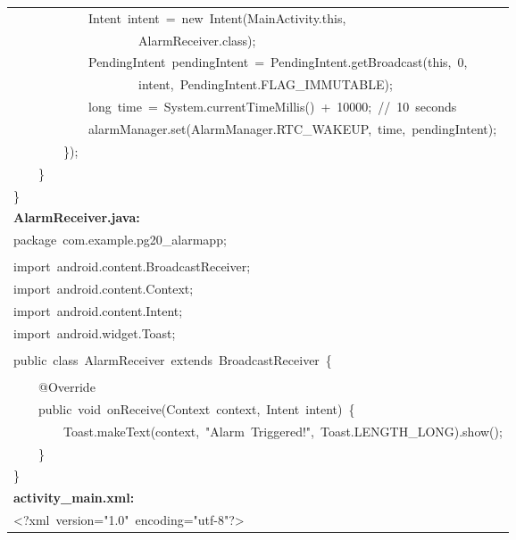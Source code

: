 \documentclass[a4paper,12pt]{article}
\begin{document}
\begin{longtable}{|p{}|}
{\ttfamily\small \ \ \ \ \ \ \ \ \ \ \ \ Intent\ intent\ =\ new\ Intent(MainActivity.this,\ } \\
{\ttfamily\small \ \ \ \ \ \ \ \ \ \ \ \ \ \ \ \ \ \ \ \ AlarmReceiver.class);} \\
{\ttfamily\small \ \ \ \ \ \ \ \ \ \ \ \ PendingIntent\ pendingIntent\ =\ PendingIntent.getBroadcast(this,\ 0,\ } \\
{\ttfamily\small \ \ \ \ \ \ \ \ \ \ \ \ \ \ \ \ \ \ \ \ intent,\ PendingIntent.FLAG\_IMMUTABLE);} \\
{\ttfamily\small \ \ \ \ \ \ \ \ \ \ \ \ long\ time\ =\ System.currentTimeMillis()\ +\ 10000;\ //\ 10\ seconds} \\
{\ttfamily\small \ \ \ \ \ \ \ \ \ \ \ \ alarmManager.set(AlarmManager.RTC\_WAKEUP,\ time,\ pendingIntent);} \\
{\ttfamily\small \ \ \ \ \ \ \ \ \});} \\
{\ttfamily\small \ \ \ \ \}} \\
{\ttfamily\small \}} \\
\hline
\rule{0pt}{13pt}\textbf{AlarmReceiver.java:} \\
\hline
{\ttfamily\small package\ com.example.pg20\_alarmapp;} \\
\strut \\
{\ttfamily\small import\ android.content.BroadcastReceiver;} \\
{\ttfamily\small import\ android.content.Context;} \\
{\ttfamily\small import\ android.content.Intent;} \\
{\ttfamily\small import\ android.widget.Toast;} \\
\strut \\
{\ttfamily\small public\ class\ AlarmReceiver\ extends\ BroadcastReceiver\ \{} \\
\strut \\
{\ttfamily\small \ \ \ \ @Override} \\
{\ttfamily\small \ \ \ \ public\ void\ onReceive(Context\ context,\ Intent\ intent)\ \{} \\
{\ttfamily\small \ \ \ \ \ \ \ \ Toast.makeText(context,\ "Alarm\ Triggered!",\ Toast.LENGTH\_LONG).show();} \\
{\ttfamily\small \ \ \ \ \}} \\
{\ttfamily\small \}} \\
\hline
\rule{0pt}{13pt}\textbf{activity\_main.xml:} \\
\hline
{\ttfamily\small \textless{}?xml\ version="1.0"\ encoding="utf-8"?\textgreater{}} \\

\end{longtable}
\end{document}
